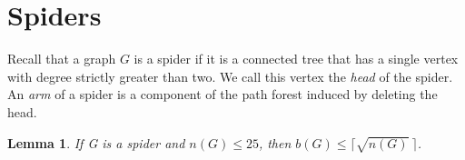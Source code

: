 \documentclass[12pt]{article}
\newtheorem{lemma}[theorem]{Lemma}
\begin{document}

\section{Spiders}
Recall that a graph $G$ is a spider if it is a connected tree that has a single vertex with degree strictly greater than two.
We call this vertex the \textit{head} of the spider.
An \textit{arm} of a spider is a component of the path forest induced by deleting the head.

\begin{lemma} \label{lem:small_spiders}
    If G is a spider and $n(G) \leq 25$, then $b(G) \leq \lceil \sqrt{n(G)}\ \rceil$.
\end{lemma}
\end{document}
